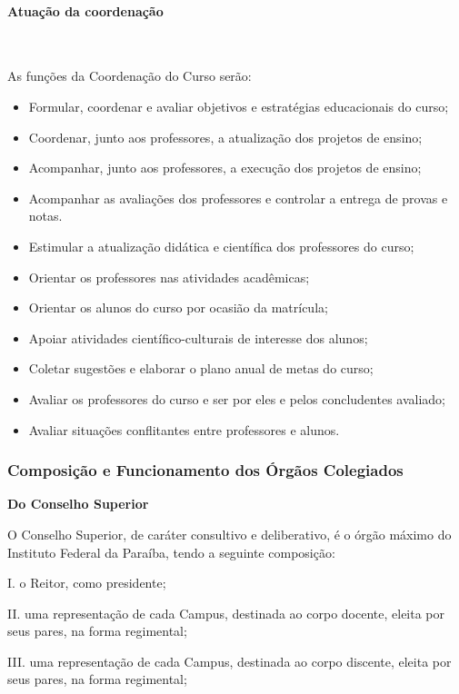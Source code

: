 \paragraph{Atua\c{c}\~ao da coordena\c{c}\~ao}\

As funções da Coordenação do Curso serão:
\begin{itemize}
\item Formular, coordenar e avaliar objetivos e estratégias educacionais do curso;
\item Coordenar, junto aos professores, a atualização dos projetos de ensino;
\item Acompanhar, junto aos professores, a execução dos projetos de ensino;
\item Acompanhar as avaliações dos professores e controlar a entrega de provas e notas.
\item Estimular a atualização didática e científica dos professores do curso;
\item Orientar os professores nas atividades acadêmicas;
\item Orientar os alunos do curso por ocasião da matrícula;
\item Apoiar atividades científico-culturais de interesse dos alunos;
\item Coletar sugestões e elaborar o plano anual de metas do curso;
\item Avaliar os professores do curso e ser por eles e pelos concludentes avaliado;
\item Avaliar situações conflitantes entre professores e alunos.
\end{itemize}

\subsubsection{Composição e Funcionamento dos Órgãos Colegiados}

\textbf{Do Conselho Superior}
\vspace{5mm}

O Conselho Superior, de caráter consultivo e deliberativo, é o órgão máximo do Instituto Federal da Paraíba, tendo a seguinte composição:

I.	o Reitor, como presidente;

II.	uma representação de cada Campus, destinada ao corpo docente, eleita por seus pares, na forma regimental;

III.	uma representação de cada Campus, destinada ao corpo discente, eleita por seus pares, na forma regimental;

